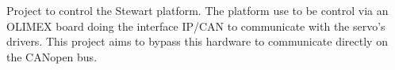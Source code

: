 Project to control the Stewart platform. The platform use to be control via an O\+L\+I\+M\+EX board doing the interface I\+P/\+C\+AN to communicate with the servo’s drivers. This project aims to bypass this hardware to communicate directly on the C\+A\+Nopen bus. 